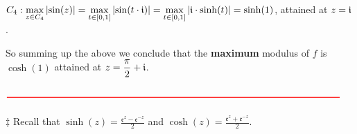 \documentclass[11pt]{amsart}
\newcommand{\dsp}{\displaystyle}
\begin{document}
$\dsp C_4: \max_{z\in C_{4}}\left|\sin(z)\right|=\max_{t\in\left[0,1\right]}\left|\sin(t\cdot \mi )\right|=\max_{t\in\left[0,1\right]}\left|\mi\cdot \sinh(t )\right|=\sinh(1)$, attained at $\dsp z=\mi$.

So summing up the above we conclude that the \textbf{maximum} modulus of $f$ is 
$\dsp\cosh(1)$ attained at $\dsp z =\frac{\pi}{2}+\mi$.

$\color{red}\rule{\textwidth}{1pt}$\\\\
$\ddag$ Recall that $\dsp\sinh(z)=\frac{\mathfrak{e}^{z}-\mathfrak{e}^{-z}}{2}$ and 
$\dsp\cosh(z)=\frac{\mathfrak{e}^{z} + \mathfrak{e}^{-z}}{2}$.
\end{document}
